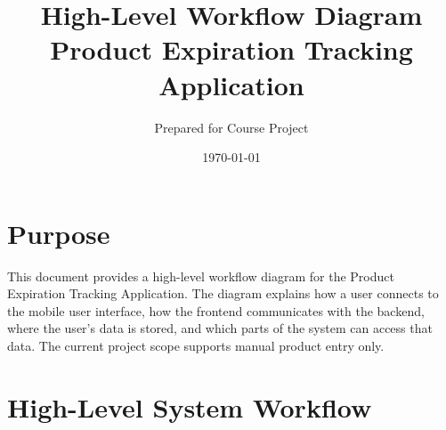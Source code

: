 \documentclass[12pt]{article}
\title{High-Level Workflow Diagram\\Product Expiration Tracking Application}
\author{Prepared for Course Project}
\date{\today}
\begin{document}
\maketitle
\thispagestyle{fancy}

\section*{Purpose}
This document provides a high-level workflow diagram for the Product Expiration Tracking Application. The diagram explains how a user connects to the mobile user interface, how the frontend communicates with the backend, where the user's data is stored, and which parts of the system can access that data. The current project scope supports manual product entry only.

\section*{High-Level System Workflow}
\end{document}
